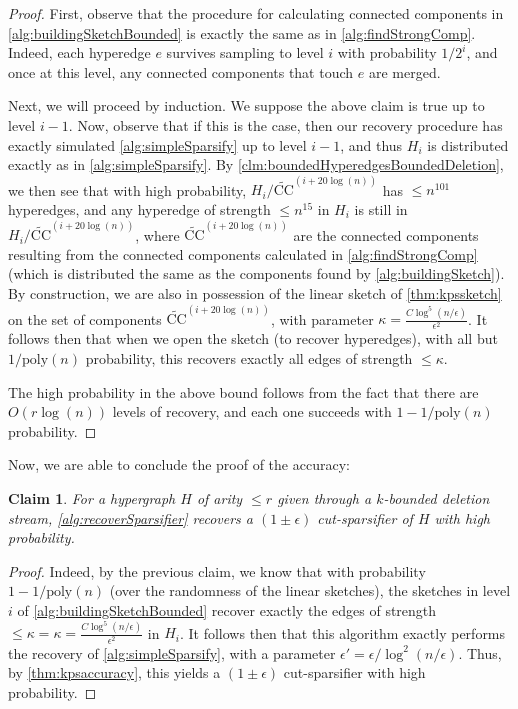 \documentclass[11pt]{article}
\newtheorem{claim}[theorem]{Claim}
\theoremstyle{definition}
\newcommand{\eps}{\epsilon}
\begin{document}
\begin{proof}
	First, observe that the procedure for calculating connected components in \cref{alg:buildingSketchBounded} is exactly the same as in \cref{alg:findStrongComp}. Indeed, each hyperedge $e$ survives sampling to level $i$ with probability $1 / 2^i$, and once at this level, any connected components that touch $e$ are merged. 
	
	
	Next, we will proceed by induction. We suppose the above claim is true up to level $i-1$. Now, observe that if this is the case, then our recovery procedure has exactly simulated \cref{alg:simpleSparsify} up to level $i-1$, and thus $H_i$ is distributed exactly as in \cref{alg:simpleSparsify}.  By \cref{clm:boundedHyperedgesBoundedDeletion}, we then see that with high probability, $H_i /  \widetilde{\mathrm{CC}}^{(i + 20 \log(n))}$ has $\leq n^{101}$ hyperedges, and any hyperedge of strength $\leq n^{15}$ in $H_i$ is still in $H_i /  \widetilde{\mathrm{CC}}^{(i + 20 \log(n))}$, where $\widetilde{\mathrm{CC}}^{(i + 20 \log(n))}$ are the connected components resulting from the connected components calculated in \cref{alg:findStrongComp} (which is distributed the same as the components found by \cref{alg:buildingSketch}). By construction, we are also in possession of the linear sketch of \cref{thm:kpssketch} on the set of components $\widetilde{\mathrm{CC}}^{(i + 20 \log(n))}$, with parameter $\kappa =  \frac{C \log^5(n / \eps)}{ \eps^2} $. It follows then that when we open the sketch (to recover hyperedges), with all but $1  / \mathrm{poly}(n)$ probability, this recovers exactly all edges of strength $\leq \kappa$.
	
	The high probability in the above bound follows from the fact that there are $O(r \log(n))$ levels of recovery, and each one succeeds with $1 -1 / \mathrm{poly}(n)$ probability. 
\end{proof}

Now, we are able to conclude the proof of the accuracy:

\begin{claim}\label{clm:accuracyBounded}
	For a hypergraph $H$ of arity $\leq r$ given through a $k$-bounded deletion stream, \cref{alg:recoverSparsifier} recovers a $(1 \pm \eps)$ cut-sparsifier of $H$ with high probability. 
\end{claim}

\begin{proof}
	Indeed, by the previous claim, we know that with probability $1 - 1 / \mathrm{poly}(n)$ (over the randomness of the linear sketches), the sketches in level $i$ of \cref{alg:buildingSketchBounded} recover exactly the edges of strength $\leq \kappa = \kappa =  \frac{C \log^5(n / \eps)}{ \eps^2}$ in $H_i$. It follows then that this algorithm exactly performs the recovery of \cref{alg:simpleSparsify}, with a parameter $\eps' = \eps / \log^2(n / \eps)$. Thus, by \cref{thm:kpsaccuracy}, this yields a $(1 \pm \eps)$ cut-sparsifier with high probability. 
\end{proof}
\end{document}
